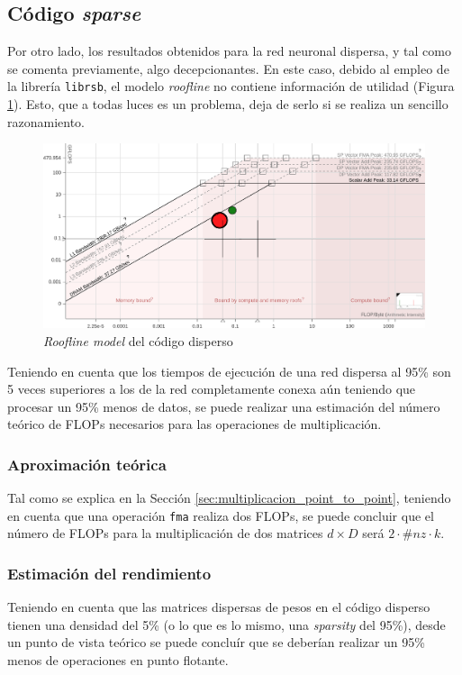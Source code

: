 \subsection{Código \textit{sparse}}
Por otro lado, los resultados obtenidos para la red neuronal dispersa, y tal como se comenta previamente, algo decepcionantes. En este caso, debido al empleo de la librería \texttt{librsb}, el modelo \textit{roofline} no contiene información de utilidad (Figura \ref{fig:roofline_sparse_details}). Esto, que a todas luces es un problema, deja de serlo si se realiza un sencillo razonamiento.

\begin{figure}[h!]
    \centering
    \includegraphics[width=\textwidth]{img/rooflines/roofline_sparse.png}
    \caption{\textit{Roofline model} del código disperso}
    \label{fig:roofline_sparse_details}
\end{figure}

Teniendo en cuenta que los tiempos de ejecución de una red dispersa al 95\% son 5 veces superiores a los de la red completamente conexa aún teniendo que procesar un 95\% menos de datos, se puede realizar una estimación del número teórico de FLOPs necesarios para las operaciones de multiplicación.

\subsubsection{Aproximación teórica}
Tal como se explica en la Sección \ref{sec:multiplicacion_point_to_point}, teniendo en cuenta que una operación \texttt{\acrshort{fma}} realiza dos FLOPs, se puede concluir que el número de FLOPs para la multiplicación de dos matrices $d\times D$ será $2 \cdot \#nz \cdot k$.

\subsubsection{Estimación del rendimiento}
Teniendo en cuenta que las matrices dispersas de pesos en el código disperso tienen una densidad del 5\% (o lo que es lo mismo, una \textit{sparsity} del 95\%), desde un punto de vista teórico se puede concluír que se deberían realizar un 95\% menos de operaciones en punto flotante.

